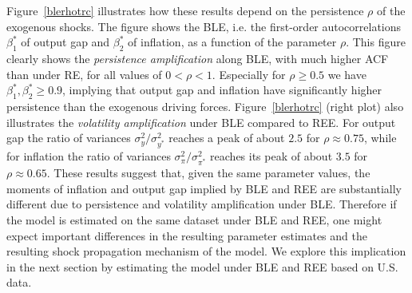 Figure~\ref{blerhotrc} illustrates how these results depend on the persistence $\rho$ of the exogenous shocks. The figure shows the BLE, i.e. the first-order autocorrelations $\beta_1^*$ of output gap and $\beta_2^*$ of inflation, as a function of the parameter $\rho$. This figure clearly shows the {\it persistence amplification} along BLE, with much higher ACF than under RE, for all values of $0< \rho <1$. Especially for $\rho\geq 0.5$ we have $\beta_1^*,\beta_2^* \geq 0.9$, implying that output gap and inflation have significantly higher persistence than the exogenous driving forces. Figure~\ref{blerhotrc} (right plot) also illustrates the {\it volatility amplification} under BLE compared to REE. For output gap the ratio of variances $\sigma_y^2/\sigma_{y^*}^2$ reaches a peak of about $2.5$ for $\rho\approx 0.75$, while for inflation the ratio of variances $\sigma_\pi^2/\sigma_{\pi^*}^2$ reaches its peak of about $3.5$ for $\rho\approx 0.65$. These results suggest that, given the same parameter values, the moments of inflation and output gap implied by BLE and REE are substantially different due to persistence and volatility amplification under BLE. Therefore if the model is estimated on the same dataset under BLE and REE, one might expect important differences in the resulting parameter estimates and the resulting shock propagation mechanism of the model. We explore this implication in the next section by estimating the model under BLE and REE based on U.S. data. 



